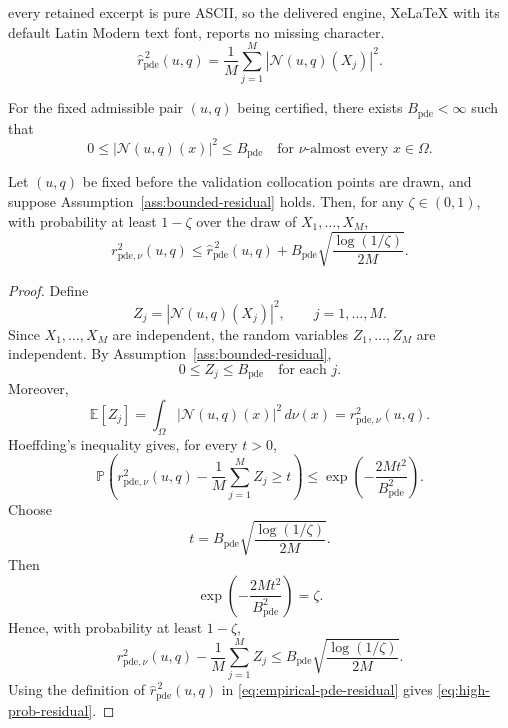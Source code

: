 \documentclass[10pt,a4paper]{amsart}
\begin{document}
every retained excerpt is pure ASCII, so the delivered engine, XeLaTeX with its default Latin Modern text font, reports no missing character.
\begin{equation}
\widehat r_{\mathrm{pde}}^{\,2}(u,q)
=
\frac{1}{M}
\sum_{j=1}^{M}
\left|
\mathcal N(u,q)(X_j)
\right|^2 .
\label{eq:empirical-pde-residual}
\end{equation}

\begin{assumption}
\label{ass:bounded-residual}
For the fixed admissible pair \((u,q)\) being certified, there exists \(B_{\mathrm{pde}}<\infty\) such that
\begin{equation}
0
\le
\left|
\mathcal N(u,q)(x)
\right|^2
\le
B_{\mathrm{pde}}
\quad
\text{for \(\nu\)-almost every } x\in\Omega .
\label{eq:bounded-residual}
\end{equation}
\end{assumption}

\begin{theorem}
\label{thm:high-prob-residual}
Let \((u,q)\) be fixed before the validation collocation points are drawn, and suppose Assumption~\ref{ass:bounded-residual} holds. Then, for any \(\zeta\in(0,1)\), with probability at least \(1-\zeta\) over the draw of \(X_1,\dots,X_M\),
\begin{equation}
r_{\mathrm{pde},\nu}^{2}(u,q)
\le
\widehat r_{\mathrm{pde}}^{\,2}(u,q)
+
B_{\mathrm{pde}}
\sqrt{
	\frac{\log(1/\zeta)}{2M}
}.
\label{eq:high-prob-residual}
\end{equation}
\end{theorem}

\begin{proof}
Define
\[
Z_j
=
\left|
\mathcal N(u,q)(X_j)
\right|^2,
\qquad
j=1,\dots,M.
\]
Since \(X_1,\dots,X_M\) are independent, the random variables \(Z_1,\dots,Z_M\) are independent. By Assumption~\ref{ass:bounded-residual},
\[
0\le Z_j\le B_{\mathrm{pde}}
\quad
\text{for each }j.
\]
Moreover,
\[
\mathbb E[Z_j]
=
\int_{\Omega}
\left|
\mathcal N(u,q)(x)
\right|^2
\,d\nu(x)
=
r_{\mathrm{pde},\nu}^{2}(u,q).
\]
Hoeffding's inequality gives, for every \(t>0\),
\[
\mathbb P\left(
r_{\mathrm{pde},\nu}^{2}(u,q)
-
\frac{1}{M}\sum_{j=1}^{M}Z_j
\ge t
\right)
\le
\exp\left(
-\frac{2Mt^2}{B_{\mathrm{pde}}^2}
\right).
\]
Choose
\[
t
=
B_{\mathrm{pde}}
\sqrt{
\frac{\log(1/\zeta)}{2M}
}.
\]
Then
\[
\exp\left(
-\frac{2Mt^2}{B_{\mathrm{pde}}^2}
\right)
=
\zeta.
\]
Hence, with probability at least \(1-\zeta\),
\[
r_{\mathrm{pde},\nu}^{2}(u,q)
-
\frac{1}{M}\sum_{j=1}^{M}Z_j
\le
B_{\mathrm{pde}}
\sqrt{
\frac{\log(1/\zeta)}{2M}
}.
\]
Using the definition of \(\widehat r_{\mathrm{pde}}^{\,2}(u,q)\) in \eqref{eq:empirical-pde-residual} gives \eqref{eq:high-prob-residual}.
\end{proof}
\end{document}
